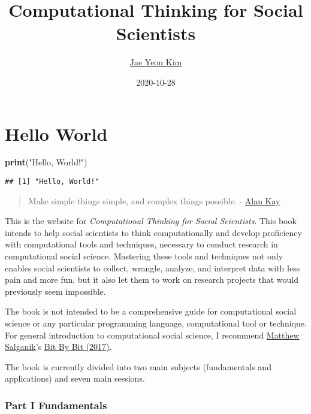 \documentclass[
]{book}
\title{Computational Thinking for Social Scientists}
\author{\href{https://jaeyk.github.io/}{Jae Yeon Kim}}
\date{2020-10-28}
\newenvironment{Shaded}{\begin{snugshade}}{\end{snugshade}}
\newcommand{\KeywordTok}[1]{\textcolor[rgb]{0.13,0.29,0.53}{\textbf{#1}}}
\newcommand{\NormalTok}[1]{#1}
\newcommand{\StringTok}[1]{\textcolor[rgb]{0.31,0.60,0.02}{#1}}
\begin{document}
\maketitle

{
\hypersetup{linkcolor=}
\setcounter{tocdepth}{1}
\tableofcontents
}
\hypertarget{hello-world}{%
\chapter{Hello World}\label{hello-world}}

\begin{Shaded}
\begin{Highlighting}[]
\KeywordTok{print}\NormalTok{(}\StringTok{"Hello, World!"}\NormalTok{)}
\end{Highlighting}
\end{Shaded}

\begin{verbatim}
## [1] "Hello, World!"
\end{verbatim}

\begin{quote}
Make simple things simple, and complex things possible. - \href{https://www.quora.com/What-is-the-story-behind-Alan-Kay-s-adage-Simple-things-should-be-simple-complex-things-should-be-possible}{Alan Kay}
\end{quote}

This is the website for \emph{Computational Thinking for Social Scientists}. This book intends to help social scientists to think computationally and develop proficiency with computational tools and techniques, necessary to conduct research in computational social science. Mastering these tools and techniques not only enables social scientists to collect, wrangle, analyze, and interpret data with less pain and more fun, but it also let them to work on research projects that would previously seem impossible.

The book is not intended to be a comprehensive guide for computational social science or any particular programming language, computational tool or technique. For general introduction to computational social science, I recommend \href{http://www.princeton.edu/~mjs3/}{Matthew Salganik}'s \href{https://www.bitbybitbook.com/}{Bit By Bit (2017)}.

The book is currently divided into two main subjects (fundamentals and applications) and seven main sessions.

\hypertarget{part-i-fundamentals}{%
\subsection{Part I Fundamentals}\label{part-i-fundamentals}}
\end{document}
